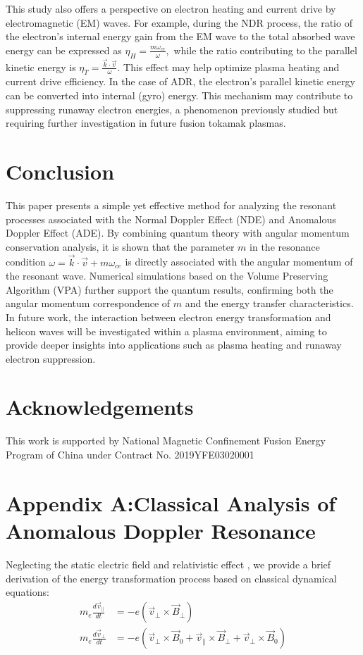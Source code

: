 \documentclass{cpbtex3}
\begin{document}
This study also offers a  perspective on electron heating and current drive by electromagnetic (EM) waves. For example, during the NDR process, the ratio of the electron's internal energy gain from the EM wave to the total absorbed wave energy can be expressed as  
\(
\eta_H = \frac{m \omega_{ce}}{\omega},
\)
while the ratio contributing to the parallel kinetic energy is  
\(
\eta_T = \frac{\vec{k} \cdot \vec{v}}{\omega}.
\)
This effect may help optimize plasma heating and current drive efficiency. In the case of ADR, the electron's parallel kinetic energy can be converted into internal (gyro) energy. This mechanism may contribute to suppressing runaway electron energies, a phenomenon previously studied \cite{guo2018control,zhang2024self} but requiring further investigation in future fusion tokamak plasmas.


\section{Conclusion}\label{sec:Conclusion}
This paper presents a simple yet effective method for analyzing the resonant processes associated with the Normal Doppler Effect (NDE) and Anomalous Doppler Effect (ADE). By combining quantum theory with angular momentum conservation analysis, it is shown that the parameter \( m \) in the resonance condition  
\(
\omega = \vec{k} \cdot \vec{v} + m\omega_{ce}
\)
is directly associated with the angular momentum of the resonant wave. Numerical simulations based on the Volume Preserving Algorithm (VPA) further support the quantum results, confirming both the angular momentum correspondence of \( m \) and the energy transfer characteristics. In future work, the interaction between electron energy transformation and helicon waves will be investigated within a plasma environment, aiming to provide deeper insights into applications such as plasma heating and runaway electron suppression.
\section{Acknowledgements}
This work is supported by National Magnetic Confinement Fusion Energy Program of China under Contract No. 2019YFE03020001
\section*{Appendix A:Classical Analysis of Anomalous Doppler Resonance}
Neglecting the static electric field and relativistic effect , we provide a brief derivation of the energy transformation process based on classical dynamical equations:
\begin{align}
m_e \frac{d\vec{v}_\parallel}{dt} &= -e(\vec{v}_\perp \times \vec{B}_\perp) \label{eq:19} \\
m_e \frac{d\vec{v}_\perp}{dt} &= -e(\vec{v}_\perp \times \vec{B}_0 + \vec{v}_\parallel \times \vec{B}_\perp + \vec{v}_\perp \times \vec{B}_0) \label{eq:20}
\end{align}
\end{document}

